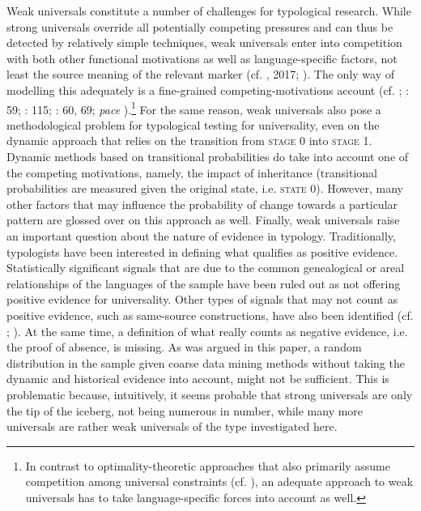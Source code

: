 \documentclass[output=paper]{langsci/langscibook}
\begin{document}
Weak universals constitute a number of challenges for typological research. While strong universals override all potentially competing pressures and can thus be detected by relatively simple techniques, weak universals enter into competition with both other functional motivations as well as language-specific factors, not least the source meaning of the relevant marker (cf. \citealt{Cristofaro2012}, 2017; \citealt{Hammarström2015}). The only way of modelling this adequately is a fine-grained competing-motivations account (cf. \citealt{Haiman1983}; \citealt{DuBois1985,Croft2003}: 59; \citealt{Bickel2014}: 115; \citealt{Hawkins2014}: 60, 69; \textit{pace} ).\footnote{In contrast to optimality-theoretic approaches that also primarily assume competition among universal constraints (cf. \citealt{Aissen2003}), an adequate approach to weak universals has to take language-specific forces into account as well.} For the same reason, weak universals also pose a methodological problem for typological testing for universality, even on the dynamic approach that relies on the transition from \textsc{stage} 0 into \textsc{stage} 1. Dynamic methods based on transitional probabilities do take into account one of the competing motivations, namely, the impact of inheritance (transitional probabilities are measured given the original state, i.e. \textsc{state 0}). However, many other factors that may influence the probability of change towards a particular pattern are glossed over on this approach as well. Finally, weak universals raise an important question about the nature of evidence in typology. Traditionally, typologists have been interested in defining what qualifies as positive evidence. Statistically significant signals that are due to the common genealogical or areal relationships of the languages of the sample have been ruled out as not offering positive evidence for universality. Other types of signals that may not count as positive evidence, such as same-source constructions, have also been identified (cf. \citealt{Cristofaro2017}; ). At the same time, a definition of what really counts as negative evidence, i.e. the proof of absence, is missing. As was argued in this paper, a random distribution in the sample given coarse data mining methods without taking the dynamic and historical evidence into account, might not be sufficient. This is problematic because, intuitively, it seems probable that strong universals are only the tip of the iceberg, not being numerous in number, while many more universals are rather weak universals of the type investigated here. 
\end{document}
